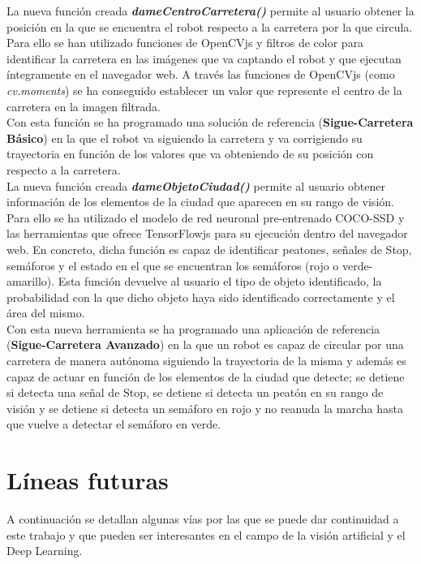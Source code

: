 \documentclass{report}
\begin{document}
La nueva función creada \textit{\textbf{dameCentroCarretera()}} permite al usuario obtener la posición en la que se encuentra el robot respecto a la carretera por la que circula. Para ello se han utilizado funciones de OpenCVjs y filtros de color para identificar la carretera en las imágenes que va captando el robot y que ejecutan íntegramente en el navegador web. A través las funciones de OpenCVjs (como \textit{cv.moments}) se ha conseguido establecer un valor que represente el centro de la carretera en la imagen filtrada.
\\ Con esta función se ha programado una solución de referencia (\textbf{Sigue-Carretera Básico}) en la que el robot va siguiendo la carretera y va corrigiendo su trayectoria en función de los valores que va obteniendo de su posición con respecto a la carretera. 
\\

La nueva función creada \textit{\textbf{dameObjetoCiudad()}} permite al usuario obtener información de los elementos de la ciudad que aparecen en su rango de visión. Para ello se ha utilizado el modelo de red neuronal pre-entrenado COCO-SSD y las herramientas que ofrece TensorFlowjs para su ejecución dentro del navegador web. En concreto, dicha función es capaz de identificar peatones, señales de Stop, semáforos y el estado en el que se encuentran los semáforos (rojo o verde-amarillo). Esta función devuelve al usuario el tipo de objeto identificado, la probabilidad con la que dicho objeto haya sido identificado correctamente y el área del mismo.\\
Con esta nueva herramienta se ha programado una aplicación de referencia (\textbf{Sigue-Carretera Avanzado}) en la que un robot es capaz de circular por una carretera de manera autónoma siguiendo la trayectoria de la misma y además es capaz de actuar en función de los elementos de la ciudad que detecte; se detiene si detecta una señal de Stop, se detiene si detecta un peatón en su rango de visión y se detiene si detecta un semáforo en rojo y no reanuda la marcha hasta que vuelve a detectar el semáforo en verde.

\section{Líneas futuras}
A continuación se detallan algunas vías por las que se puede dar continuidad a este trabajo y que pueden ser interesantes en el campo de la visión artificial y el Deep Learning.
\end{document}
